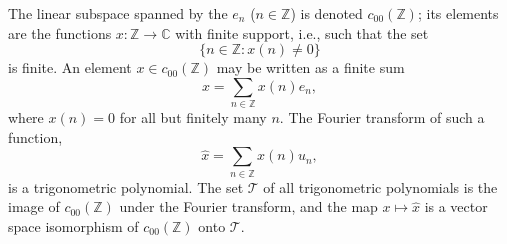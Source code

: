 The linear subspace spanned by the $e_n$ ($n \in \mathbb{Z}$) is denoted $c_{00}(\mathbb{Z})$; its elements are the functions $x: \mathbb{Z} \to \mathbb{C}$ with finite support, i.e., such that the set
$$\{n \in \mathbb{Z} : x(n) \neq 0\}$$
is finite. An element $x \in c_{00}(\mathbb{Z})$ may be written as a finite sum
$$x = \sum_{n \in \mathbb{Z}} x(n) e_n,$$
where $x(n) = 0$ for all but finitely many $n$. The Fourier transform of such a function,
$$\hat{x} = \sum_{n \in \mathbb{Z}} x(n) u_n,$$
is a trigonometric polynomial. The set $\mathcal{T}$ of all trigonometric polynomials is the image of $c_{00}(\mathbb{Z})$ under the Fourier transform, and the map $x \mapsto \hat{x}$ is a vector space isomorphism of $c_{00}(\mathbb{Z})$ onto $\mathcal{T}$.
